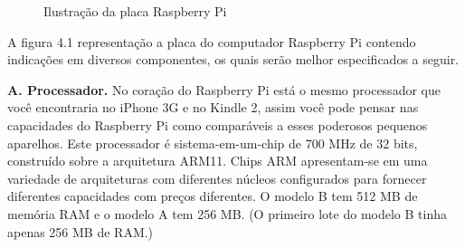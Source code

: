 \begin{figure}[ht]
    \centering
    \caption{Ilustração da placa Raspberry Pi}
\end{figure}

A figura 4.1 representação a placa do computador Raspberry Pi contendo indicações em diversos componentes, os quais serão melhor especificados a seguir.

\textbf{A. Processador.} No coração do Raspberry Pi está o mesmo processador que você encontraria no iPhone 3G e no Kindle 2, assim você pode pensar nas capacidades do Raspberry Pi como comparáveis a esses poderosos pequenos aparelhos. Este processador é sistema-em-um-chip de 700 MHz de 32 bits, construído sobre a arquitetura ARM11. Chips ARM apresentam-se em uma variedade de arquiteturas com diferentes núcleos configurados para fornecer diferentes capacidades com preços diferentes. O modelo B tem 512 MB de memória RAM e o modelo A tem 256 MB. (O primeiro lote do modelo B tinha apenas 256 MB de RAM.)
    
